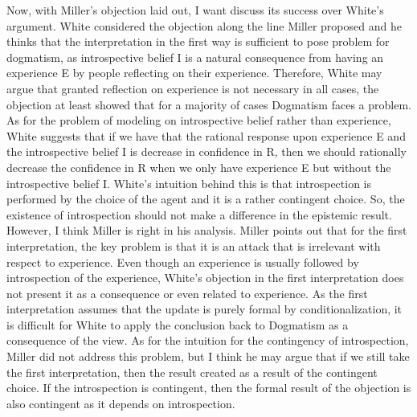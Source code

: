 Now, with Miller's objection laid out, I want discuss its success over
White's argument. White considered the objection along the line Miller
proposed and he thinks that the interpretation in the first way is
sufficient to pose problem for dogmatism, as introspective belief I is a
natural consequence from having an experience E by people reflecting on
their experience. Therefore, White may argue that granted reflection on
experience is not necessary in all cases, the objection at least showed
that for a majority of cases Dogmatism faces a problem. As for the
problem of modeling on introspective belief rather than experience,
White suggests that if we have that the rational response upon
experience E and the introspective belief I is decrease in confidence in
R, then we should rationally decrease the confidence in R when we only
have experience E but without the introspective belief I. White's
intuition behind this is that introspection is performed by the choice
of the agent and it is a rather contingent choice. So, the existence of
introspection should not make a difference in the epistemic result.
However, I think Miller is right in his analysis. Miller points out that
for the first interpretation, the key problem is that it is an attack
that is irrelevant with respect to experience. Even though an experience
is usually followed by introspection of the experience, White's
objection in the first interpretation does not present it as a
consequence or even related to experience. As the first interpretation
assumes that the update is purely formal by conditionalization, it is
difficult for White to apply the conclusion back to Dogmatism as a
consequence of the view. As for the intuition for the contingency of
introspection, Miller did not address this problem, but I think he may
argue that if we still take the first interpretation, then the result
created as a result of the contingent choice. If the introspection is
contingent, then the formal result of the objection is also contingent
as it depends on introspection.

